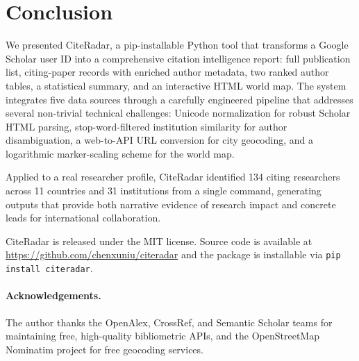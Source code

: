\documentclass[11pt]{article}
\begin{document}
\section{Conclusion}
\label{sec:conc}

We presented CiteRadar, a pip-installable Python tool that transforms a
Google Scholar user ID into a comprehensive citation intelligence report:
full publication list, citing-paper records with enriched author metadata,
two ranked author tables, a statistical summary, and an interactive HTML
world map.
The system integrates five data sources through a carefully engineered
pipeline that addresses several non-trivial technical challenges: Unicode
normalization for robust Scholar HTML parsing, stop-word-filtered institution
similarity for author disambiguation, a web-to-API URL conversion for
city geocoding, and a logarithmic marker-scaling scheme for the world map.

Applied to a real researcher profile, CiteRadar identified 134 citing
researchers across 11 countries and 31 institutions from a single command,
generating outputs that provide both narrative evidence of research impact
and concrete leads for international collaboration.

CiteRadar is released under the MIT license.
Source code is available at \url{https://github.com/chenxuniu/citeradar}
and the package is installable via \texttt{pip install citeradar}.

\paragraph{Acknowledgements.}
The author thanks the OpenAlex, CrossRef, and Semantic Scholar teams for
maintaining free, high-quality bibliometric APIs, and the OpenStreetMap
Nominatim project for free geocoding services.
\end{document}
